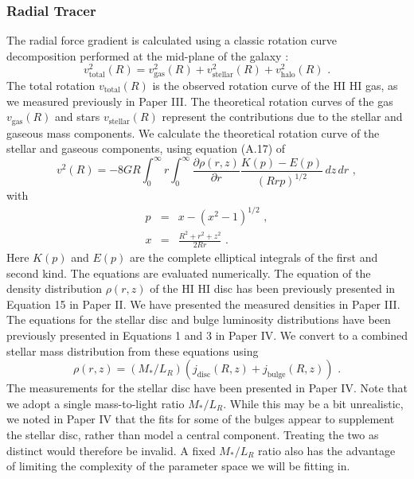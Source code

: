 \documentclass[useAMS,usenatbib]{mn2e}
\newcommand{\hi}{%
  \relax
  \ifmmode
    \textrm{\textsc{HI}}
  \else
    \textsc{H{\smaller}I}
  \fi
}
\begin{document}
\subsubsection{Radial Tracer}
The radial force gradient is calculated using a classic rotation curve 
decomposition performed at the mid-plane of the galaxy \citep{vanAlbada1985A}:
\begin{equation}
 v_\textrm{total}^2(R) = v_\textrm{gas}^2(R) + v_\textrm{stellar}^2(R) + v_\textrm{halo}^2(R)\,\,.\label{eqn:vresidual}
\end{equation}
The total rotation $v_\textrm{total}(R)$ is the observed rotation curve of 
the \hi gas, as we measured previously in Paper III. 
The theoretical rotation curves of the gas $v_\textrm{gas}(R)$ and stars 
$v_\textrm{stellar}(R)$  represent the contributions due to the stellar 
and gaseous mass components.
We calculate the theoretical rotation curve of the stellar and gaseous 
components, using equation (A.17) of \citet{Casertano83}
\begin{equation}
v^2(R) = -8GR \int_0^\infty r \int_0^\infty \frac{\partial \rho(r,z)}{\partial r} \frac{K(p)-E(p)}{(Rrp)^{1/2}} \,dz\,dr \,\,,
\end{equation}
with 
\begin{eqnarray}
p &=& x - (x^2 -1)^{1/2}\,\,,\\
x &=& \frac{R^2 + r^2 + z^2}{2Rr}\,\,.
\end{eqnarray}
Here $K(p)$ and $E(p)$ are the complete elliptical integrals of the first 
and second kind. 
The equations are evaluated numerically.
The equation of the density distribution $\rho(r,z)$ of the \hi disc has 
been previously presented in Equation 15 in Paper II. 
We have presented the measured densities in Paper III.
The equations for the stellar disc and bulge luminosity distributions have 
been previously presented in Equations 1 and 3 in Paper IV.
We convert to a combined stellar mass distribution from these equations using
\begin{equation}
 \rho(r,z) = (M_*/L_R)\left(j_\textrm{disc}(R,z) + j_\textrm{bulge}(R,z)\right)\,\,.
\end{equation}
The measurements for the stellar disc have been presented in Paper IV.
Note that we adopt a single mass-to-light ratio $M_*/L_R$.
While this may be a bit unrealistic, we noted in Paper IV that the fits for 
some of the bulges appear to supplement the stellar disc, rather than 
model a central component.
Treating the two as distinct would therefore be invalid.
A fixed $M_*/L_R$ ratio also has the advantage of limiting the complexity 
of the parameter space we will be fitting in. 
\end{document}
